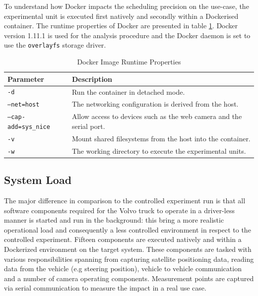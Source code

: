 To understand how Docker impacts the scheduling precision on the use-case, the experimental unit is executed first natively and secondly within a Dockerised container. The runtime properties of Docker are presented in table \ref{docker-parameters-truck}. Docker version 1.11.1 is used for the analysis procedure and the Docker daemon is set to use the \texttt{overlayfs} storage driver.



\begin{table}[ht]
\centering
\caption{Docker Image Runtime Properties}
\label{docker-parameters-truck}
\begin{tabular}{|l|p{10cm}|}
\hline
\textbf{Parameter}           & \textbf{Description}                                            \\ \hline
\texttt{-d}                  & Run the container in detached mode.                             \\ \hline
\texttt{--net=host}          & The networking configuration is derived from the host.          \\ \hline
\texttt{--cap-add=sys\_nice} & Allow access to devices such as the web camera and the serial port. \\ \hline
\texttt{-v}                  & Mount shared filesystems from the host into the container.    \\ \hline
\texttt{-w}                  & The working directory to execute the experimental units.               \\ \hline
\end{tabular}
\end{table}


\subsection{System Load}
\label{sec:truck-load}

The major difference in comparison to the controlled experiment run is that all software components required for the Volvo truck to operate in a driver-less manner is started and run in the background: this bring a more realistic operational load and consequently a less controlled environment in respect to the controlled experiment. Fifteen components are executed natively and within a Dockerized environment on the target system. These components are tasked with various responsibilities spanning from capturing satellite positioning data, reading data from the vehicle (e.g steering position), vehicle to vehicle communication and a number of camera operating components. Measurement points are captured via serial communication to measure the impact in a real use case.\\

